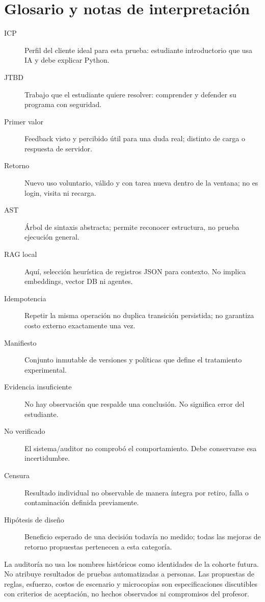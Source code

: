 \documentclass[11pt,a4paper]{report}
\begin{document}
\chapter{Glosario y notas de interpretación}
\begin{description}
\item[ICP] Perfil del cliente ideal para esta prueba: estudiante introductorio que usa IA y debe explicar Python.
\item[JTBD] Trabajo que el estudiante quiere resolver: comprender y defender su programa con seguridad.
\item[Primer valor] Feedback visto y percibido útil para una duda real; distinto de carga o respuesta de servidor.
\item[Retorno] Nuevo uso voluntario, válido y con tarea nueva dentro de la ventana; no es login, visita ni recarga.
\item[AST] Árbol de sintaxis abstracta; permite reconocer estructura, no prueba ejecución general.
\item[RAG local] Aquí, selección heurística de registros JSON para contexto. No implica embeddings, vector DB ni agentes.
\item[Idempotencia] Repetir la misma operación no duplica transición persistida; no garantiza costo externo exactamente una vez.
\item[Manifiesto] Conjunto inmutable de versiones y políticas que define el tratamiento experimental.
\item[Evidencia insuficiente] No hay observación que respalde una conclusión. No significa error del estudiante.
\item[No verificado] El sistema/auditor no comprobó el comportamiento. Debe conservarse esa incertidumbre.
\item[Censura] Resultado individual no observable de manera íntegra por retiro, falla o contaminación definida previamente.
\item[Hipótesis de diseño] Beneficio esperado de una decisión todavía no medido; todas las mejoras de retorno propuestas pertenecen a esta categoría.
\end{description}

La auditoría no usa los nombres históricos como identidades de la cohorte futura. No atribuye resultados de pruebas automatizadas a personas. Las propuestas de reglas, esfuerzo, costos de escenario y microcopias son especificaciones discutibles con criterios de aceptación, no hechos observados ni compromisos del profesor.
\end{document}
